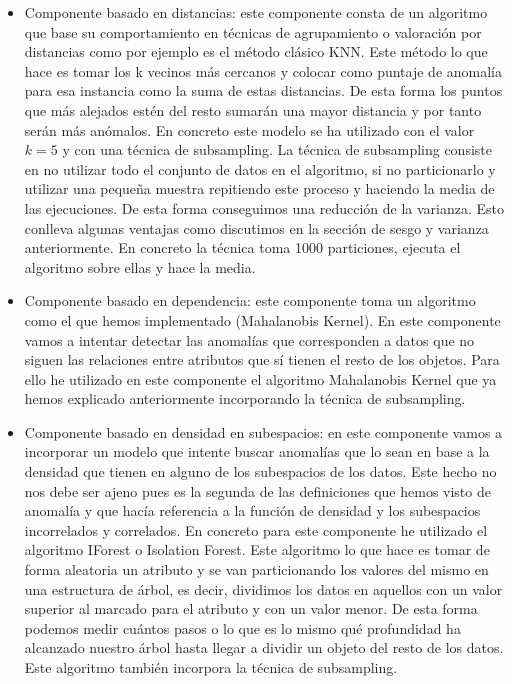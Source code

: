 \begin{itemize}
	\item Componente basado en distancias: este componente consta de un algoritmo que base su comportamiento en técnicas de agrupamiento o valoración por distancias como por ejemplo es el método clásico KNN. Este método lo que hace es tomar los k vecinos más cercanos y colocar como puntaje de anomalía para esa instancia como la suma de estas distancias. De esta forma los puntos que más alejados estén del resto sumarán una mayor distancia y por tanto serán más anómalos. En concreto este modelo se ha utilizado con el valor $k=5$ y con una técnica de subsampling. La técnica de subsampling consiste en no utilizar todo el conjunto de datos en el algoritmo, si no particionarlo y utilizar una pequeña muestra repitiendo este proceso y haciendo la media de las ejecuciones. De esta forma conseguimos una reducción de la varianza. Esto conlleva algunas ventajas como discutimos en la sección de sesgo y varianza anteriormente. En concreto la técnica toma 1000 particiones, ejecuta el algoritmo sobre ellas y hace la media.
	\item Componente basado en dependencia: este componente toma un algoritmo como el que hemos implementado (Mahalanobis Kernel). En este componente vamos a intentar detectar las anomalías que corresponden a datos que no siguen las relaciones entre atributos que sí tienen el resto de los objetos. Para ello he utilizado en este componente el algoritmo Mahalanobis Kernel que ya hemos explicado anteriormente incorporando la técnica de subsampling.
	\item Componente basado en densidad en subespacios: en este componente vamos a incorporar un modelo que intente buscar anomalías que lo sean en base a la densidad que tienen en alguno de los subespacios de los datos. Este hecho no nos debe ser ajeno pues es la segunda de las definiciones que hemos visto de anomalía y que hacía referencia a la función de densidad y los subespacios incorrelados y correlados. En concreto para este componente he utilizado el algoritmo IForest o Isolation Forest. Este algoritmo lo que hace es tomar de forma aleatoria un atributo y se van particionando los valores del mismo en una estructura de árbol, es decir, dividimos los datos en aquellos con un valor superior al marcado para el atributo y con un valor menor. De esta forma podemos medir cuántos pasos o lo que es lo mismo qué profundidad ha alcanzado nuestro árbol hasta llegar a dividir un objeto del resto de los datos. Este algoritmo también incorpora la técnica de subsampling.
\end{itemize}

